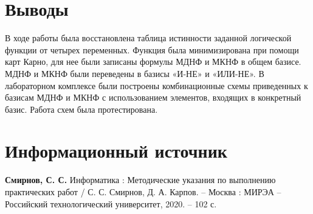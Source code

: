 \documentclass[14pt, a4paper]{extreport}
\begin{document}
\chapter{Выводы}
В ходе работы была восстановлена таблица истинности заданной логической функции от четырех переменных. Функция была минимизирована при помощи карт Карно, для нее были записаны формулы МДНФ и МКНФ в общем базисе. МДНФ и МКНФ были переведены в базисы «И-НЕ» и «ИЛИ-НЕ». В лабораторном комплексе были построены комбинационные схемы приведенных к базисам МДНФ и МКНФ с использованием элементов, входящих в конкретный базис. Работа схем была протестирована.

\chapter{Информационный источник}
\textbf{Смирнов, С. С.} Информатика : Методические указания по выполнению практических работ / С. С. Смирнов, Д. А. Карпов. -- Москва : МИРЭА -- Российский технологический университет, 2020. -- 102 с.
\end{document}
